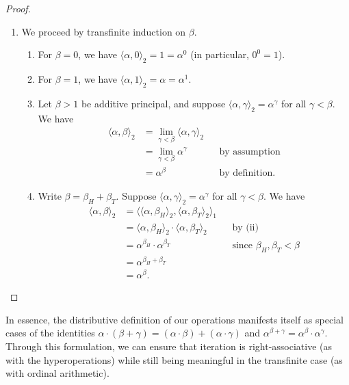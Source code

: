 \documentclass[12pt, a4paper]{article}
\theoremstyle{definition}
\theoremstyle{remark}
\newcommand{\op}[2]{\langle#1, #2\rangle}
\begin{document}
\begin{proof}
\begin{enumerate}
\begin{enumerate}
\begin{align*}
                    &= \op\alpha{\beta_H}_1 + \op\alpha{\beta_T}_1 && \text{by (i)} \\
                    &= (\alpha \cdot \beta_H) + (\alpha \cdot \beta_T) && \text{since } \beta_H, \beta_T < \beta \\
                    &= \alpha \cdot (\beta_H + \beta_T) && \\
                    &= \alpha \cdot \beta. &&
                \end{align*}
        \end{enumerate}
        \item[(iii)] We proceed by transfinite induction on $\beta$.
        \begin{enumerate}
            \item[(1)] For $\beta = 0$, we have $\op\alpha0_2 = 1 = \alpha^0$ (in particular, $0^0 = 1$).
            \item[(2)] For $\beta = 1$, we have $\op\alpha1_2 = \alpha = \alpha^1$.
            \item[(3)] Let $\beta > 1$ be additive principal, and suppose $\op\alpha\gamma_2 = \alpha^\gamma$ for all $\gamma < \beta$. We have
                \begin{align*}
                    \op\alpha\beta_2 &= \textstyle\lim_{\gamma < \beta} {\op\alpha\gamma_2} && \\
                    &= \textstyle\lim_{\gamma < \beta} \alpha^\gamma && \text{by assumption} \\
                    &= \alpha^\beta && \text{by definition.}
                \end{align*}
            \item[(4)] Write $\beta = \beta_H + \beta_T$. Suppose $\op\alpha\gamma_2 = \alpha^\gamma$ for all $\gamma < \beta$. We have
                \begin{align*}
                    \op\alpha\beta_2 &= \op{\op\alpha{\beta_H}_2}{\op\alpha{\beta_T}_2}_1 && \\
                    &= \op\alpha{\beta_H}_2 \cdot \op\alpha{\beta_T}_2 && \text{by (ii)} \\
                    &= \alpha^{\beta_H} \cdot \alpha^{\beta_T} && \text{since } \beta_H, \beta_T < \beta \\
                    &= \alpha^{\beta_H + \beta_T} && \\
                    &= \alpha^\beta. &&
                \end{align*}
        \end{enumerate}
    \end{enumerate}
\end{proof}

In essence, the distributive definition of our operations manifests itself as special cases of the identities $\alpha \cdot (\beta + \gamma) = (\alpha\cdot\beta) + (\alpha\cdot\gamma)$ and $\alpha^{\beta+\gamma} = \alpha^\beta \cdot \alpha^\gamma$. Through this formulation, we can ensure that iteration is right-associative (as with the hyperoperations) while still being meaningful in the transfinite case (as with ordinal arithmetic).

\printbibliography
\end{document}
